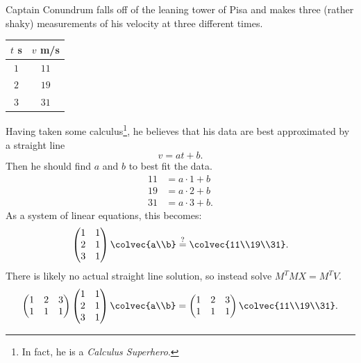 \begin{example}
Captain Conundrum falls off of the leaning tower of Pisa and makes three (rather shaky) measurements of his velocity at three different times.

\begin{center}
\begin{tabular}{cc}
$t$ s & $v $ m/s \\ \hline
$1$ & $11$ \\
$2$ & $19$ \\
$3$ & $31$
\end{tabular}
\end{center}

Having taken some calculus\footnote{In fact, he is a \emph{Calculus Superhero}.}, he believes that his data are best approximated by a straight line
\[
v = at+b.
\]
Then he should find $a$ and $b$ to best fit the data.
\begin{align*}
11 &= a\cdot 1 + b \\
19 &= a\cdot 2 + b \\
31 &= a\cdot 3 + b.
\end{align*}
As a system of linear equations, this becomes:
\[
\begin{pmatrix}
1 & 1 \\
2 & 1 \\
3 & 1 \\
\end{pmatrix}
\colvec{a\\b} \stackrel{?}{=}
\colvec{11\\19\\31}.
\]
There is likely no actual straight line solution, so instead solve $M^TMX=M^TV$.
\[
\begin{pmatrix}
1 & 2 & 3 \\
1 & 1 & 1 \\
\end{pmatrix}
\begin{pmatrix}
1 & 1 \\
2 & 1 \\
3 & 1 \\
\end{pmatrix} \colvec{a\\b}
= 
\begin{pmatrix}
1 & 2 & 3 \\
1 & 1 & 1 \\
\end{pmatrix}
\colvec{11\\19\\31}.
\]
\end{example}
